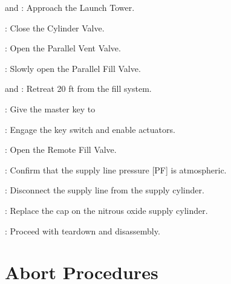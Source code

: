\begin{checklist}
    \item \primary{} and \secondary: Approach the Launch Tower.
    \item \primary{}: Close the Cylinder Valve.
    \item \primary{}: Open the Parallel Vent Valve.
    \item \primary{}: Slowly open the Parallel Fill Valve.
    \item \primary{} and \secondary: Retreat 20 ft from the fill system.
    \item \ops: Give the master key to \control{}
    \item \control{}: Engage the key switch and enable actuators.
    \item \control{}: Open the Remote Fill Valve.
    \item \control{}: Confirm that the supply line pressure [PF] is atmospheric.
    \item \primary{}: Disconnect the supply line from the supply cylinder.
    \item \primary{}: Replace the cap on the nitrous oxide supply cylinder.
    \item \ops{}: Proceed with teardown and disassembly.
\setcounter{checklistnum}{0}
\newpage
    
\section{Abort Procedures} 

\end{checklist}
